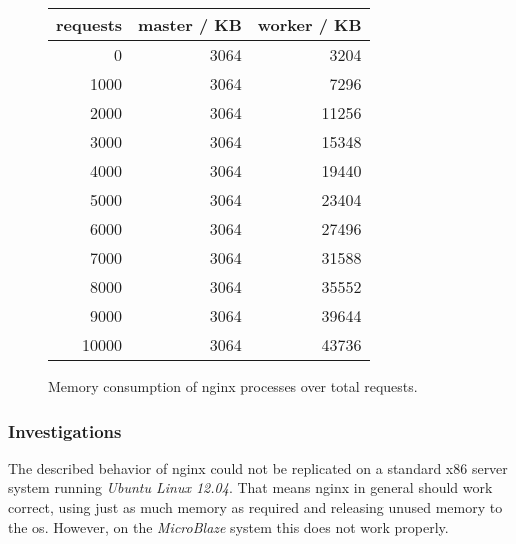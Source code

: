 \begin{figure}[H]
\begin{minipage}{0.4\textwidth}
\begin{tabular}{|r|r|r|}
    \hline
     \textbf{requests} & \textbf{master / KB} & \textbf{worker / KB} \\
    \hline
    0     & 3064  & 3204 \\
    1000  & 3064  & 7296 \\
    2000  & 3064  & 11256 \\
    3000  & 3064  & 15348 \\
    4000  & 3064  & 19440 \\
    5000  & 3064  & 23404 \\
    6000  & 3064  & 27496 \\
    7000  & 3064  & 31588 \\
    8000  & 3064  & 35552 \\
    9000  & 3064  & 39644 \\
    10000 & 3064  & 43736 \\
    \hline
    \end{tabular}
\end{minipage}
\begin{minipage}{0.65\textwidth}
	\centering
\end{minipage}
  \label{fig:nginx-mem}
  \caption{Memory consumption of nginx processes over total requests.}
\end{figure}

\subsubsection{Investigations}

The described behavior of nginx could not be replicated on a standard x86 server system running \textit{Ubuntu Linux 12.04}. That means nginx in general should work correct, using just as much memory as required and releasing unused memory to the \gls{os}. However, on the \textit{MicroBlaze} system this does not work properly.

